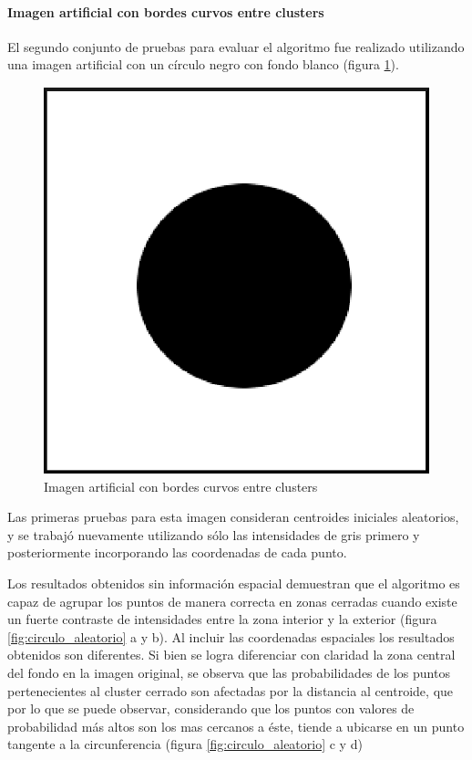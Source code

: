 \paragraph{Imagen artificial con bordes curvos entre clusters}
El segundo conjunto de pruebas para evaluar el algoritmo fue realizado utilizando una imagen artificial con un círculo negro con fondo blanco  (figura \ref{fig:circulo}).

\begin{figure}[H]
\centering
\includegraphics[scale=0.3]{images/circulo_250x250.eps}
\caption{Imagen artificial con bordes curvos entre clusters}
\label{fig:circulo}
\end{figure}

Las primeras pruebas para esta imagen consideran centroides iniciales aleatorios, y se trabajó nuevamente utilizando sólo las intensidades de gris primero y posteriormente incorporando las coordenadas de cada punto.

Los resultados obtenidos sin información espacial demuestran que el algoritmo es capaz de agrupar los puntos de manera correcta en zonas cerradas cuando existe un fuerte contraste de intensidades entre la zona interior y la exterior (figura \ref{fig:circulo_aleatorio} a y b). Al incluir las coordenadas espaciales los resultados obtenidos son diferentes. Si bien se logra diferenciar con claridad la zona central del fondo en la imagen original, se observa que las probabilidades de los puntos pertenecientes al cluster cerrado son afectadas por la distancia al centroide, que por lo que se puede observar, considerando que los puntos con valores de probabilidad más altos son los mas cercanos a éste, tiende a ubicarse en un punto tangente a la circunferencia (figura \ref{fig:circulo_aleatorio} c y d)

